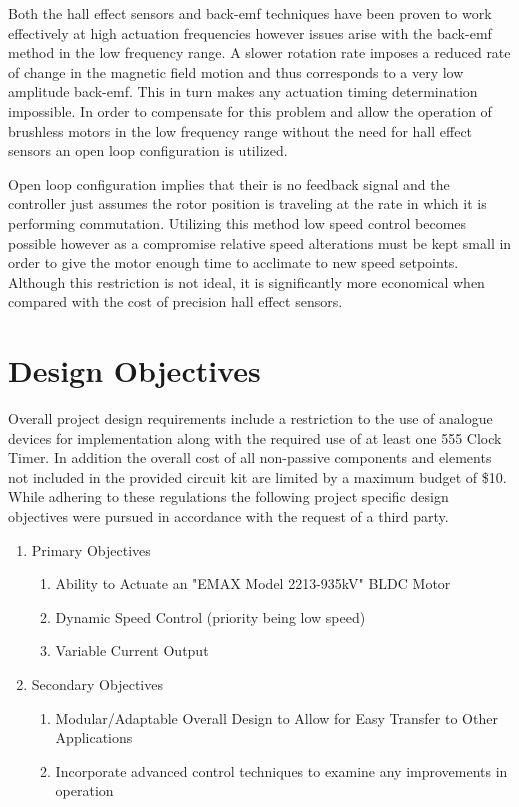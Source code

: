 \documentclass[12pt]{article}
\begin{document}
Both the hall effect sensors and back-emf techniques have been proven to work effectively at high actuation frequencies however issues arise with the back-emf method in the low frequency range. A slower rotation rate imposes a reduced rate of change in the magnetic field motion and thus corresponds to a very low amplitude back-emf. This in turn makes any actuation timing determination impossible. In order to compensate for this problem and allow the operation of brushless motors in the low frequency range without the need for hall effect sensors an open loop configuration is utilized.

Open loop configuration implies that their is no feedback signal and the controller just assumes the rotor position is traveling at the rate in which it is performing commutation. Utilizing this method low speed control becomes possible however as a compromise relative speed alterations must be kept small in order to give the motor enough time to acclimate to new speed setpoints. Although this restriction is not ideal, it is significantly more economical when compared with the cost of precision hall effect sensors.
\pagebreak
\section{Design Objectives}%

Overall project design requirements include a restriction to the use of analogue devices for implementation along with the required use of at least one 555 Clock Timer. In addition the overall cost of all non-passive components and elements not included in the provided circuit kit are limited by a maximum budget of \$10. While adhering to these regulations the following project specific design objectives were pursued in accordance with the request of a third party.

\begin{enumerate}
\item Primary Objectives
    \begin{enumerate}
     \item Ability to Actuate an "EMAX Model 2213-935kV" BLDC Motor
     \item Dynamic Speed Control (priority being low speed)
     \item Variable Current Output
    \end{enumerate}
\item Secondary Objectives
    \begin{enumerate}
    \item Modular/Adaptable Overall Design to Allow for Easy Transfer to Other Applications
    \item Incorporate advanced control techniques to examine any improvements in operation
    \end{enumerate}
\end{enumerate}
\end{document}
